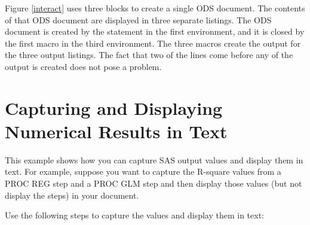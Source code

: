 \documentclass[article,oneside]{memoir}
\begin{document}
  Figure \ref{interact} uses three  blocks to create a single ODS document.
  The contents of that ODS document are displayed in three separate listings.
  The ODS document is created by the  statement in the first
   environment, and it is closed by the first 
  macro in the third  environment.
  The three  macros create the output for the
  three output listings.
  The fact that two of the  lines come before any of the output is
  created does not pose a problem.

\section{Capturing and Displaying Numerical Results in Text}

This example shows how you can capture SAS output values and display them in text.
For example, suppose you want to capture the R-square values from a PROC REG
step and a PROC GLM step and then display those values
(but not display the steps) in your document.

Use the following steps to capture the values and display them in text:
\end{document}
